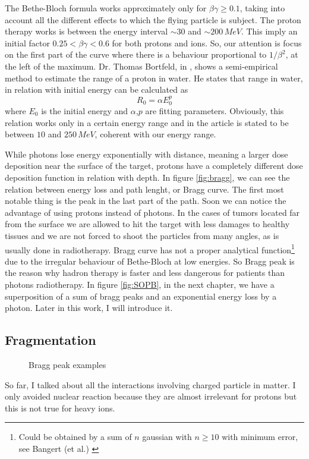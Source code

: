 \documentclass[12pt, a4paper, twoside]{book}
\begin{document}
The Bethe-Bloch formula works approximately only for $\beta\gamma\ge 0.1$, taking into account all the different effects to which the flying particle is subject. The proton therapy works is between the energy interval $\sim30$ and $\sim200\,MeV$. This imply an initial factor $0.25<\beta\gamma<0.6$ for both protons and ions. So, our attention is focus on the first part of the curve where there is a behaviour proportional to $1/\beta^2$, at the left of the maximum.
Dr. Thomas Bortfeld, in \cite{bort:bragg}, shows a semi-empirical method to estimate the range of a proton in water. He states that range in water, in relation with initial energy can be calculated as
\[
R_0 = \alpha E_0^p
\]
where $E_0$ is the initial energy and $\alpha$,$p$ are fitting parameters. Obviously, this relation works only in a certain energy range and in the article is stated to be between $10$ and $250\,MeV$, coherent with our energy range.

While photons lose energy exponentially with distance, meaning a larger dose deposition near the surface of the target, protons have a completely different dose deposition function in relation with depth.
In figure \ref{fig:bragg}, we can see the relation between energy loss and path lenght, or Bragg curve. The first most notable thing is the peak in the last part of the path. Soon we can notice the advantage of using protons instead of photons. In the cases of tumors located far from the surface we are allowed to hit the target with less damages to healthy tissues and we are not forced to shoot the particles from many angles, as is usually done in radiotherapy.
Bragg curve has not a proper analytical function\footnote{Could be obtained by a sum of $n$ gaussian with $n\geq 10$ with minimum error, see Bangert (et al.) \cite{bang:apm}} due to the irregular behaviour of Bethe-Bloch at low energies. So Bragg peak is the reason why hadron therapy is faster and less dangerous for patients than photons radiotherapy. 
In figure \ref{fig:SOPB}, in the next chapter, we have a superposition of a sum of bragg peaks and an exponential energy loss by a photon. Later in this work, I will introduce it.


\subsection{Fragmentation}
\begin{figure}[!t]
     \hfill
\hspace{2mm}
\caption{Bragg peak examples}
   \end{figure}
So far, I talked about all the interactions involving charged particle in matter. I only avoided nuclear reaction because they are almost irrelevant for protons but this is not true for heavy ions.
\end{document}
